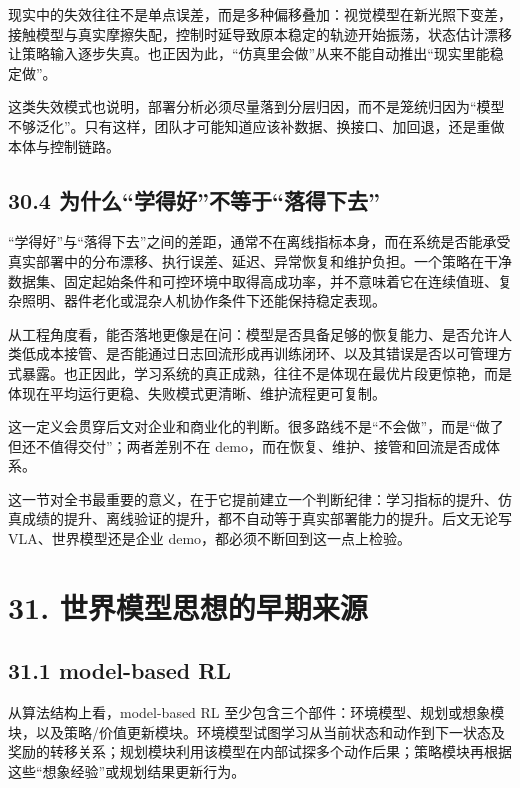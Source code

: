 现实中的失效往往不是单点误差，而是多种偏移叠加：视觉模型在新光照下变差，接触模型与真实摩擦失配，控制时延导致原本稳定的轨迹开始振荡，状态估计漂移让策略输入逐步失真。也正因为此，“仿真里会做”从来不能自动推出“现实里能稳定做”。

这类失效模式也说明，部署分析必须尽量落到分层归因，而不是笼统归因为“模型不够泛化”。只有这样，团队才可能知道应该补数据、换接口、加回退，还是重做本体与控制链路。

\subsection*{30.4 为什么“学得好”不等于“落得下去”}


“学得好”与“落得下去”之间的差距，通常不在离线指标本身，而在系统是否能承受真实部署中的分布漂移、执行误差、延迟、异常恢复和维护负担。一个策略在干净数据集、固定起始条件和可控环境中取得高成功率，并不意味着它在连续值班、复杂照明、器件老化或混杂人机协作条件下还能保持稳定表现。

从工程角度看，能否落地更像是在问：模型是否具备足够的恢复能力、是否允许人类低成本接管、是否能通过日志回流形成再训练闭环、以及其错误是否以可管理方式暴露。也正因此，学习系统的真正成熟，往往不是体现在最优片段更惊艳，而是体现在平均运行更稳、失败模式更清晰、维护流程更可复制。

这一定义会贯穿后文对企业和商业化的判断。很多路线不是“不会做”，而是“做了但还不值得交付”；两者差别不在 demo，而在恢复、维护、接管和回流是否成体系。

这一节对全书最重要的意义，在于它提前建立一个判断纪律：学习指标的提升、仿真成绩的提升、离线验证的提升，都不自动等于真实部署能力的提升。后文无论写 VLA、世界模型还是企业 demo，都必须不断回到这一点上检验。

\section*{31. 世界模型思想的早期来源}

\subsection*{31.1 model-based RL}


从算法结构上看，model-based RL 至少包含三个部件：环境模型、规划或想象模块，以及策略/价值更新模块。环境模型试图学习从当前状态和动作到下一状态及奖励的转移关系；规划模块利用该模型在内部试探多个动作后果；策略模块再根据这些“想象经验”或规划结果更新行为。

